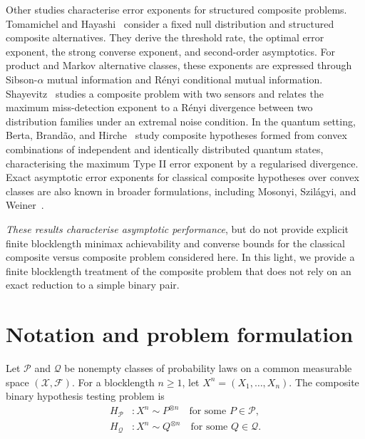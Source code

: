 \documentclass[journal,12pt,draftclsnofoot,onecolumn]{IEEEtran}
\begin{document}
Other studies characterise error exponents for structured composite problems. Tomamichel and Hayashi~\cite{tomamichel2017operational} consider a fixed null distribution and structured composite alternatives. They derive the threshold rate, the optimal error exponent, the strong converse exponent, and second-order asymptotics. For product and Markov alternative classes, these exponents are expressed through Sibson-$\alpha$ mutual information and R\'enyi conditional mutual information. Shayevitz~\cite{shayevitz2011renyi} studies a composite problem with two sensors and relates the maximum miss-detection exponent to a R\'enyi divergence between two distribution families under an extremal noise condition. In the quantum setting, Berta, Brand\~ao, and Hirche~\cite{berta2021composite} study composite hypotheses formed from convex combinations of independent and identically distributed quantum states, characterising the maximum Type II error exponent by a regularised divergence. Exact asymptotic error exponents for classical composite hypotheses over convex classes are also known in broader formulations, including Mosonyi, Szil\'agyi, and Weiner~\cite{mosonyi2021error}.

\textit{These results characterise asymptotic performance}, but do not provide explicit finite blocklength minimax achievability and converse bounds for the classical composite versus composite problem considered here. In this light, we provide a finite blocklength treatment of the composite problem that does not rely on an exact reduction to a simple binary pair.


\section{Notation and problem formulation}
\label{sec:problem-formulation}

Let $\mathcal P$ and $\mathcal Q$ be nonempty classes of probability laws on a common measurable space $(\mathcal X,\mathcal F)$. For a blocklength $n\geq1$, let $X^n=(X_1,\ldots,X_n)$. The composite binary hypothesis testing problem is
\begin{equation*}
\begin{aligned}
H_{\mathcal P}
&:X^n\sim P^{\otimes n}
\quad\text{for some }P\in\mathcal P,\\
H_{\mathcal Q}
&:X^n\sim Q^{\otimes n}
\quad\text{for some }Q\in\mathcal Q.
\end{aligned}
\end{equation*}
\end{document}
